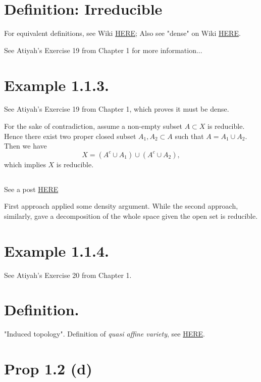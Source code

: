 
\section{Definition: Irreducible}

For equivalent definitions, see Wiki \href{https://en.wikipedia.org/wiki/Irreducible_component}{HERE};
Also see "dense" on Wiki \href{https://en.wikipedia.org/wiki/Dense_set}{HERE}.

See Atiyah's \cite{atiyah1994introduction} Exercise 19 from Chapter 1 for more information...

\section{Example 1.1.3.}
See Atiyah's \cite{atiyah1994introduction} Exercise 19 from Chapter 1, which proves it must be dense.

For the sake of contradiction, assume a non-empty subset $A\subset X$ is reducible. Hence there exist two proper closed subset $A_1,A_2\subset A$ such that $A=A_1\cup A_2$.
Then we have $$X=(A^c\cup A_1)\cup (A^c\cup A_2),$$ which implies $X$ is reducible. 
\subsection{}
See a post \href{https://math.stackexchange.com/questions/460074/an-open-subset-of-an-irreducible-set-is-dense}{HERE} 

First approach applied some density argument. While the second approach, similarly, gave a decomposition of the whole space given the open set is reducible.

\section{Example 1.1.4.}

See Atiyah's \cite{atiyah1994introduction} Exercise 20 from Chapter 1.

\section{Definition.} 
"Induced topology". Definition of \textit{quasi affine variety}, see \href{https://math.stackexchange.com/questions/1086839/a-confusion-regarding-the-definition-of-a-quasi-affine-variety}{HERE}.

\section{Prop 1.2 (d)}

